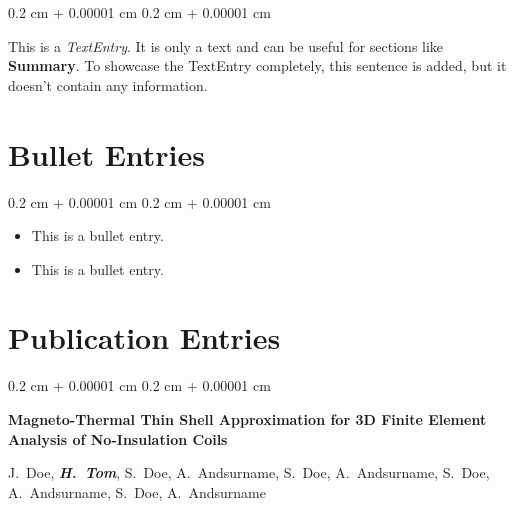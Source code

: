 \documentclass[10pt, letterpaper]{article}
\newenvironment{highlightsforbulletentries}{
    \begin{itemize}[
        topsep=0.10 cm,
        parsep=0.10 cm,
        partopsep=0pt,
        itemsep=0pt,
        leftmargin=10pt
    ]
}{
    \end{itemize}
} %
\newenvironment{onecolentry}{
    \begin{adjustwidth}{
        0.2 cm + 0.00001 cm
    }{
        0.2 cm + 0.00001 cm
    }
}{
    \end{adjustwidth}
} %
\begin{document}
        \begin{onecolentry}
            This is a \textit{TextEntry}. It is only a text and can be useful for sections like \textbf{Summary}. To showcase the TextEntry completely, this sentence is added, but it doesn't contain any information.
        \end{onecolentry}


    
    \section{Bullet Entries}

    \begin{onecolentry}
        \begin{highlightsforbulletentries}


        \item This is a bullet entry.

        \item This is a bullet entry.


        \end{highlightsforbulletentries}
    \end{onecolentry}

    \section{Publication Entries}



        
        \begin{samepage}
            \begin{onecolentry}
                \textbf{Magneto-Thermal Thin Shell Approximation for 3D Finite Element Analysis of No-Insulation Coils}

                \vspace{0.10 cm}

                \mbox{J. Doe}, \mbox{\textbf{\textit{H. Tom}}}, \mbox{S. Doe}, \mbox{A. Andsurname}, \mbox{S. Doe}, \mbox{A. Andsurname}, \mbox{S. Doe}, \mbox{A. Andsurname}, \mbox{S. Doe}, \mbox{A. Andsurname}
            \end{onecolentry}


        \end{samepage}

        \vspace{0.2 cm}
\end{document}

